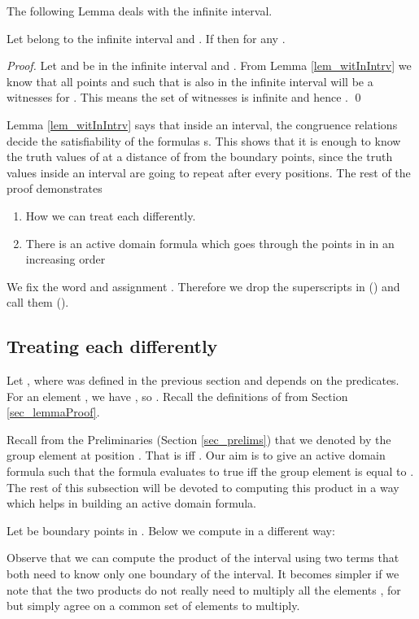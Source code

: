 \documentclass[envcountsame]{llncs}
\begin{document}
The following Lemma deals with the infinite interval.

\begin{lemma}
 \label{lem_infInterval}
 Let  belong to the infinite interval and . If  then 
 for any .
\end{lemma}
\begin{proof}
Let  and  be in the infinite interval and . From Lemma \ref{lem_witInIntrv} we know that all points
 and such that  is also in the infinite interval will be a witnesses for . This means the set of witnesses is infinite and hence .
\qed \end{proof}

Lemma \ref{lem_witInIntrv} says that inside an interval, the congruence relations decide the satisfiability of the formulas s.
This shows that it is enough to know the truth values of  at a distance of  from the boundary points, since the truth
values inside an interval are going to repeat after every  positions.
The rest of the proof demonstrates 
\begin{enumerate}
 \item How we can treat each  differently. 
\item There is an active domain formula which goes through the points in  in an increasing order
\end{enumerate}
We fix the word  and assignment . Therefore we drop the superscripts in
 () and call them  (). 
\subsection{Treating each  differently}
Let , where  was defined in the previous section and depends on the  predicates.
For an element , we have , so .
Recall the definitions of  from Section \ref{sec_lemmaProof}. 

Recall from the Preliminaries (Section \ref{sec_prelims}) that we denoted by  the group element at position . That is
 iff . Our aim is to give an active domain formula such that the formula evaluates to true iff the group element  is equal to . The rest of this subsection will be devoted to computing this product in a way which helps in building an active domain formula.

Let  be boundary points in . Below we compute  in a different way:

Observe that we can compute the product of the interval using two terms that both need to know only one boundary of the interval.
It becomes simpler if we note that the two products do not really need to multiply all the elements , for  but simply agree on a common set of elements to multiply. 
\end{document}
